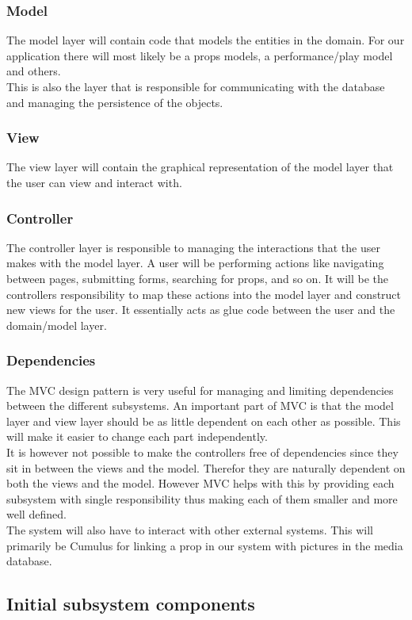 \documentclass[12pt]{article}
\begin{document}
\subsubsection{Model}
The model layer will contain code that models the entities in the domain. For
our application there will most likely be a props models, a performance/play
model and others.\\
This is also the layer that is responsible for communicating with the database
and managing the persistence of the objects.
\subsubsection{View}
The view layer will contain the graphical representation of the model layer that
the user can view and interact with.
\subsubsection{Controller}
The controller layer is responsible to managing the interactions that the user
makes with the model layer. A user will be performing actions like navigating
between pages, submitting forms, searching for props, and so on. It will be the
controllers responsibility to map these actions into the model layer and
construct new views for the user. It essentially acts as glue code between the
user and the domain/model layer.

\subsubsection{Dependencies}
The MVC design pattern is very useful for managing and limiting dependencies
between the different subsystems. An important part of MVC is that the model
layer and view layer should be as little dependent on each other as possible.
This will make it easier to change each part independently.\\
It is however not possible to make the controllers free of dependencies since
they sit in between the views and the model. Therefor they are naturally
dependent on both the views and the model. However MVC helps with this by
providing each subsystem with single responsibility thus making each of them
smaller and more well defined.\\
The system will also have to interact with other external systems. This will
primarily be Cumulus for linking a prop in our system with pictures in the media
database.
\subsection{Initial subsystem components}
\end{document}
